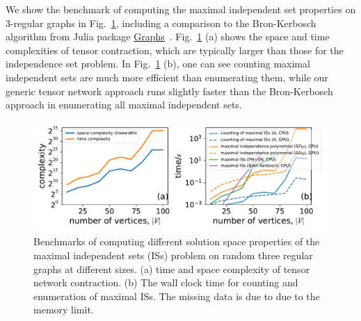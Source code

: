 \documentclass[onefignum, onetabnum]{siamart190516}
\newcommand{\<}{\langle}
\renewcommand{\>}{\rangle}
\newcommand{\Fig}[1]{Fig.~\ref{#1}}
\begin{document}
We show the benchmark of computing the maximal independent set properties on $3$-regular graphs in \Fig{fig:benchmark-maximal},
including a comparison to the Bron-Kerbosch algorithm from Julia package \href{https://github.com/JuliaGraphs/Graphs.jl}{Graphs}~\cite{Graphs}.
\Fig{fig:benchmark-maximal} (a) shows the space and time complexities of tensor contraction, which are typically larger than those for the independence set problem.
In \Fig{fig:benchmark-maximal} (b), one can see counting maximal independent sets are much more efficient than enumerating them, while our generic tensor network approach runs slightly faster than the Bron-Kerbosch approach in enumerating all maximal independent sets.

\begin{figure} 
    \centering
    \includegraphics[width=\textwidth, trim={0cm 0cm 0cm 0cm}, clip]{figures/fig2.pdf}
    \caption{Benchmarks of computing different solution space properties of the maximal independent sets (ISs) problem on random three regular graphs at different sizes.
    (a) time and space complexity of tensor network contraction. 
    (b) The wall clock time for counting and enumeration of maximal ISs. The missing data is due to due to the memory limit.
    }
    \label{fig:benchmark-maximal}
\end{figure}
\end{document}
